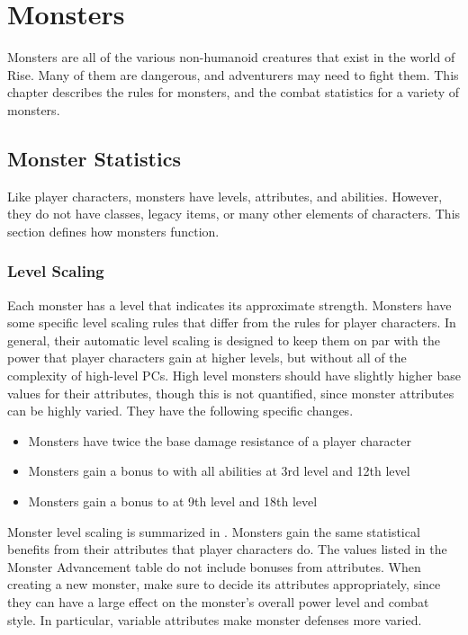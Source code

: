 \chapter{Monsters}

Monsters are all of the various non-humanoid creatures that exist in the world of Rise.
Many of them are dangerous, and adventurers may need to fight them.
This chapter describes the rules for monsters, and the combat statistics for a variety of monsters.

\section{Monster Statistics}
    Like player characters, monsters have levels, attributes, and abilities.
    However, they do not have classes, legacy items, or many other elements of characters.
    This section defines how monsters function.

    \subsection{Level Scaling}
        Each monster has a level that indicates its approximate strength.
        Monsters have some specific level scaling rules that differ from the rules for player characters.
        In general, their automatic level scaling is designed to keep them on par with the power that player characters gain at higher levels, but without all of the complexity of high-level PCs.
        High level monsters should have slightly higher base values for their attributes, though this is not quantified, since monster attributes can be highly varied.
        They have the following specific changes.
        \begin{itemize}
            \item Monsters have twice the base damage resistance of a player character
            \item Monsters gain a  bonus to  with all abilities at 3rd level and 12th level
            \item Monsters gain a  bonus to  at 9th level and 18th level
        \end{itemize}

        Monster level scaling is summarized in .
        Monsters gain the same statistical benefits from their attributes that player characters do.
        The values listed in the Monster Advancement table do not include bonuses from attributes.
        When creating a new monster, make sure to decide its attributes appropriately, since they can have a large effect on the monster's overall power level and combat style.
        In particular, variable attributes make monster defenses more varied.

